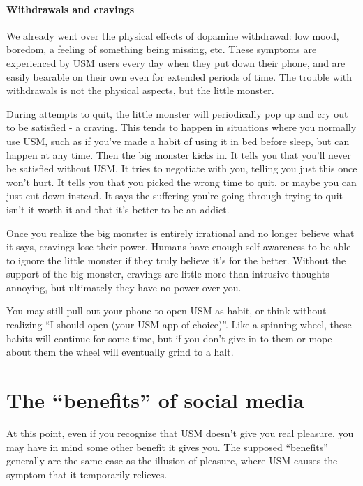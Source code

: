 \documentclass[
]{book}
\begin{document}
\subsubsection{Withdrawals and cravings}\label{withdrawals-and-cravings}

We already went over the physical effects of dopamine withdrawal: low mood, boredom, a feeling of something being missing, etc. These symptoms are experienced by USM users every day when they put down their phone, and are easily bearable on their own even for extended periods of time. The trouble with withdrawals is not the physical aspects, but the little monster.

During attempts to quit, the little monster will periodically pop up and cry out to be satisfied - a craving. This tends to happen in situations where you normally use USM, such as if you've made a habit of using it in bed before sleep, but can happen at any time. Then the big monster kicks in. It tells you that you'll never be satisfied without USM. It tries to negotiate with you, telling you just this once won't hurt. It tells you that you picked the wrong time to quit, or maybe you can just cut down instead. It says the suffering you're going through trying to quit isn't it worth it and that it's better to be an addict.

Once you realize the big monster is entirely irrational and no longer believe what it says, cravings lose their power. Humans have enough self-awareness to be able to ignore the little monster if they truly believe it's for the better. Without the support of the big monster, cravings are little more than intrusive thoughts - annoying, but ultimately they have no power over you.

You may still pull out your phone to open USM as habit, or think without realizing ``I should open (your USM app of choice)''. Like a spinning wheel, these habits will continue for some time, but if you don't give in to them or mope about them the wheel will eventually grind to a halt.

\chapter{The ``benefits'' of social media}\label{benefits}

At this point, even if you recognize that USM doesn't give you real pleasure, you may have in mind some other benefit it gives you. The supposed ``benefits'' generally are the same case as the illusion of pleasure, where USM causes the symptom that it temporarily relieves.
\end{document}
